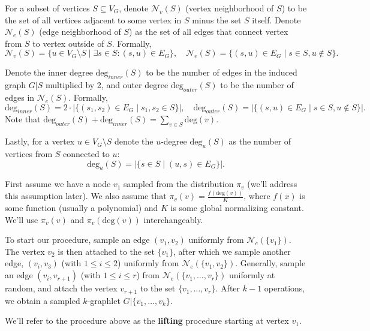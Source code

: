 \documentclass[11pt]{article}
\def\deg{\mathrm{deg}}
\def\cN{\mathcal{N}}
\theoremstyle{remark}
\theoremstyle{definition}
\begin{document}
	For a subset of vertices $S \subseteq V_G$, denote $\cN_v(S)$ (vertex neighborhood of 
	$S$) to be the set of all vertices 
	adjacent to some vertex in $S$ minus the set $S$ itself. Denote $\cN_e(S)$ (edge 
	neighborhood of $S$) as the set of all
	edges that connect vertex from $S$ to vertex outside of $S$.
	Formally,
	\begin{equation}
		\cN_v(S) = \{u\in V_G\setminus S \mid \exists s\in S : (s,u)\in E_G\}, \quad
		\cN_e(S) = \{(s,u)\in E_G \mid s\in S, u\notin S\}.
	\end{equation}	
	
	Denote the inner degree $\deg_{inner}(S)$ to be the number of edges in the induced
	graph $G|S$ multiplied by 2, and outer degree $\deg_{outer}(S)$ to be the number of 
	edges in $\cN_e(S)$. Formally,
	\begin{equation}
		\deg_{inner}(S) = 2\cdot|\{(s_1,s_2)\in E_G \mid s_1,s_2\in S\}|, \quad
		\deg_{outer}(S) = |\{(s,u)\in E_G \mid s\in S, u\notin S\}|.
	\end{equation}
	Note that $\deg_{outer}(S) + \deg_{inner}(S) = \sum_{v\in S} \deg(v)$.
	
	Lastly, for a vertex $u\in V_G\setminus S$ denote the $u$-degree $\deg_u(S)$ as
	the number of vertices from $S$ connected to $u$:
	\begin{equation*}
		\deg_u(S) = |\{s\in S\mid (u,s)\in E_G\}|.
	\end{equation*} 
	
	First assume we have a node $v_1$ sampled from the distribution $\pi_v$ (we'll 
	address this assumption later). 
	We also assume that $\pi_v(v) = \frac{f(\deg(v))}{K}$, where $f(x)$ is some function 
	(usually a polynomial) and $K$ is some global normalizing 
	constant. We'll use $\pi_v(v)$ and $\pi_v(\deg(v))$ interchangeably.
	
	To start our procedure, sample an edge $(v_1,v_2)$ uniformly from $\cN_e(\{v_1\})$. 
	The vertex $v_2$ is then attached to the set $\{v_1\}$, after which we sample another 
	edge, $(v_i, v_3)$ (with $1\leq i\leq 2$) uniformly from $\cN_e(\{v_1,v_2\})$. 
	Generally, sample an edge $(v_i, v_{r+1})$ (with $1\leq i \leq r$) from 
	$\cN_e(\{v_1,\ldots, v_r\})$ uniformly at random, and attach the vertex $v_{r+1}$ to the 
	set $\{v_1,\ldots,v_r\}$.
	After $k-1$ operations, we obtain a sampled $k$-graphlet $G|\{v_1,\ldots, v_k\}$.
	
	We'll refer to the procedure above as the \textbf{lifting} procedure starting at vertex 
	$v_1$.
	
\end{document}
